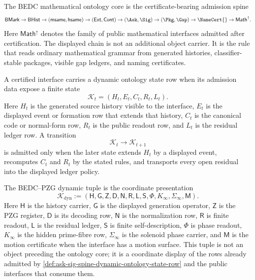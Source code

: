 \begin{definition}
\label{def:ask-sig-spine-mathematical-ontology-core}
The BEDC mathematical ontology core is the certificate-bearing admission
spine
$$
\mathsf{BMark}
\to
\mathsf{BHist}
\to
(\mathsf{msame},\mathsf{hsame})
\to
(\mathsf{Ext},\mathsf{Cont})
\to
(\Ask,\Sig)
\to
(\Pkg,\Gap)
\to
\NameCert{}
\to
\mathsf{Math}^{\uparrow}.
$$
Here $\mathsf{Math}^{\uparrow}$ denotes the family of public mathematical
interfaces admitted after certification.  The displayed chain is not an
additional object carrier.  It is the rule that reads ordinary mathematical
grammar from generated histories, classifier-stable packages, visible gap
ledgers, and naming certificates.
\end{definition}

\begin{definition}
\label{def:ask-sig-spine-dynamic-ontology-state-row}
A certified interface carries a dynamic ontology state row when its admission
data expose a finite state
$$
\mathcal K_t=(H_t,E_t,C_t,R_t,L_t).
$$
Here $H_t$ is the generated source history visible to the interface, $E_t$
is the displayed event or formation row that extends that history, $C_t$ is
the canonical code or normal-form row, $R_t$ is the public readout row, and
$L_t$ is the residual ledger row.  A transition
$$
\mathcal K_t\longrightarrow\mathcal K_{t+1}
$$
is admitted only when the later state extends $H_t$ by a displayed event,
recomputes $C_t$ and $R_t$ by the stated rules, and transports every open
residual into the displayed ledger policy.
\end{definition}

\begin{definition}
\label{def:ask-sig-spine-bedc-pzg-dynamic-tuple}
The BEDC--PZG dynamic tuple is the coordinate presentation
$$
\mathcal K_{\mathrm{dyn}}
:=
(\mathsf H,\mathsf G,\mathsf Z,\mathsf D,\mathsf N,\mathsf R,\mathsf L,
\mathsf S,\Phi,K_\infty,\Sigma_\infty,\mathsf M).
$$
Here $\mathsf H$ is the history carrier, $\mathsf G$ is the displayed
generation operator, $\mathsf Z$ is the PZG register, $\mathsf D$ is its
decoding row, $\mathsf N$ is the normalization row, $\mathsf R$ is finite
readout, $\mathsf L$ is the residual ledger, $\mathsf S$ is finite
self-description, $\Phi$ is phase readout, $K_\infty$ is the hidden
prime-fibre row, $\Sigma_\infty$ is the solenoid phase carrier, and
$\mathsf M$ is the motion certificate when the interface has a motion
surface.  This tuple is not an object preceding the ontology core; it is a
coordinate display of the rows already admitted by
\autoref{def:ask-sig-spine-dynamic-ontology-state-row} and the public
interfaces that consume them.
\end{definition}

